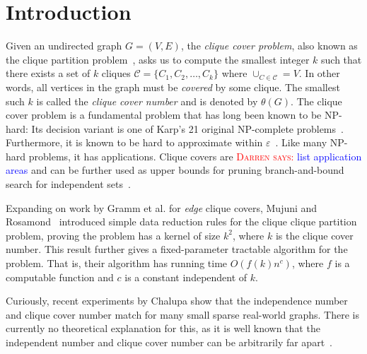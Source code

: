 \documentclass[sigconf]{acmart}
\newcommand{\niceremark}[3]{\textcolor{red}{\textsc{#1 #2: }}\textcolor{blue}{\textsf{#3}}}
\newcommand{\darren}[2][says]{\niceremark{Darren}{#1}{#2}}
\begin{document}
\maketitle

\begin{CCSXML}
\end{CCSXML}



\section{Introduction}
\label{sec:Introduction}
Given an undirected graph $G=(V,E)$, the \emph{clique cover problem}, also known as the clique partition problem~\cite{}, asks us to compute the smallest integer $k$ such that there exists a set of $k$ cliques $\mathcal{C} = \{C_1,C_2,\ldots, C_k\}$ where $\cup_{C\in\mathcal{C}} = V$. In other words, all vertices in the graph must be \emph{covered} by some clique. The smallest such $k$ is called the \emph{clique cover number} and is denoted by $\theta(G)$. 
The clique cover problem is a fundamental problem that has long been known to be NP-hard: Its decision variant is one of Karp's 21 original NP-complete problems~\cite{karp1972reducibility}. Furthermore, it is known to be hard to approximate within $\varepsilon$~\cite{}. Like many NP-hard problems, it has applications. Clique covers are \darren{list application areas} and can be further used as upper bounds for pruning branch-and-bound search for independent sets~\cite{}.

Expanding on work by Gramm et al. for \emph{edge} clique covers, Mujuni and Rosamond~\cite{mujuni-2008} introduced simple data reduction rules for the clique clique partition problem, proving the problem has a kernel of size $k^2$, where $k$ is the clique cover number. This result further gives a fixed-parameter tractable algorithm for the problem. That is, their algorithm has running time $O(f(k)n^c)$, where $f$ is a computable function and $c$ is a constant independent of $k$.

Curiously, recent experiments by Chalupa show that the independence number and clique cover number match for many small sparse real-world graphs. There is currently no theoretical explanation for this, as it is well known that the independent number and clique cover number can be arbitrarily far apart~\cite{}.
\end{document}
